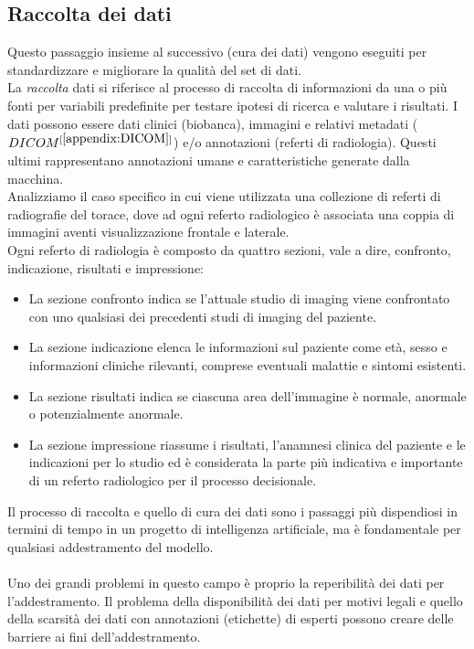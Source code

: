 \documentclass[12pt,a4paper]{report}
\begin{document}
\subsection{Raccolta dei dati}
Questo passaggio insieme al successivo (cura dei dati) vengono eseguiti per standardizzare e migliorare la qualità del set di dati.\\
La \emph{raccolta} dati si riferisce al processo di raccolta di informazioni da una o più fonti per variabili predefinite per testare ipotesi di ricerca e valutare i risultati. 
I dati possono essere dati clinici (biobanca), immagini e relativi metadati ($DICOM^{[\ref{appendix:DICOM}]}$) e/o annotazioni (referti di radiologia). Questi ultimi rappresentano annotazioni umane e caratteristiche generate dalla macchina.\\
Analizziamo il caso specifico in cui viene utilizzata una collezione di referti di radiografie del torace, dove ad ogni referto radiologico è associata una coppia di immagini aventi visualizzazione frontale e laterale.\\
Ogni referto di radiologia è composto da quattro sezioni, vale a dire, confronto, indicazione, risultati e impressione:
\begin{itemize}
    \item La sezione confronto indica se l'attuale studio di imaging viene confrontato con uno qualsiasi dei precedenti studi di imaging del paziente.
    \item La sezione indicazione elenca le informazioni sul paziente come età, sesso e informazioni cliniche rilevanti, comprese eventuali malattie e sintomi esistenti.
    \item La sezione risultati indica se ciascuna area dell'immagine è normale, anormale o potenzialmente anormale.
    \item La sezione impressione riassume i risultati, l'anamnesi clinica del paziente e le indicazioni per lo studio ed è considerata la parte più indicativa e importante di un referto radiologico per il processo decisionale.
\end{itemize}

Il processo di raccolta e quello di cura dei dati sono i passaggi più dispendiosi in termini di tempo in un progetto di intelligenza artificiale, ma è fondamentale per qualsiasi addestramento del modello.\\
\\
Uno dei grandi problemi in questo campo è proprio la reperibilità dei dati per l’addestramento.
Il problema della disponibilità dei dati per motivi legali e quello della scarsità dei dati con annotazioni (etichette) di esperti possono creare delle barriere ai fini dell’addestramento.
\end{document}
